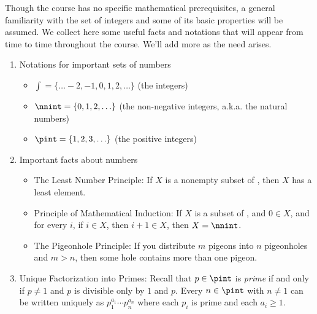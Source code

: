 Though the course has no specific mathematical prerequisites, a general familiarity with the set of integers and some of its basic properties will be assumed. We collect here some useful facts and notations that will appear from time to time throughout the course. We'll add more as the need arises.
\begin{enumerate}
\item 
Notations for important sets of numbers
\begin{itemize}
\item 
$\int=\{\ldots -2,-1,0,1,2,\ldots\}$ (the integers)
\item 
$\nnint=\{0,1,2,\ldots\}$ (the non-negative integers, a.k.a. the natural numbers)
\item 
$\pint=\{1,2,3,\ldots\}$ (the positive integers)
\end{itemize}
\item 
Important facts about numbers
\begin{itemize}
\item 
The Least Number Principle: If $X$ is a nonempty subset of \nnint, then $X$ has a least element.
\item 
Principle of Mathematical Induction: If $X$ is a subset of \nnint, and $0\in X$, and for every $i$, if $i\in X$, then $i+1\in X$, then $X=\nnint$.
\item The Pigeonhole Principle: If you distribute $m$ pigeons into $n$ pigeonholes and $m>n$, then some hole contains more than one pigeon.
\end{itemize}
\item Unique Factorization into Primes: Recall that $p\in\pint$ is \emph{prime} if and only if $p\neq1$ and $p$ is divisible only by $1$ and $p$. Every $n\in\pint$ with $n\neq 1$ can be written uniquely as $p_1^{a_1}\cdots p_n^{a_n}$ where each $p_i$ is prime and each $a_i\geq 1$. 
\end{enumerate}